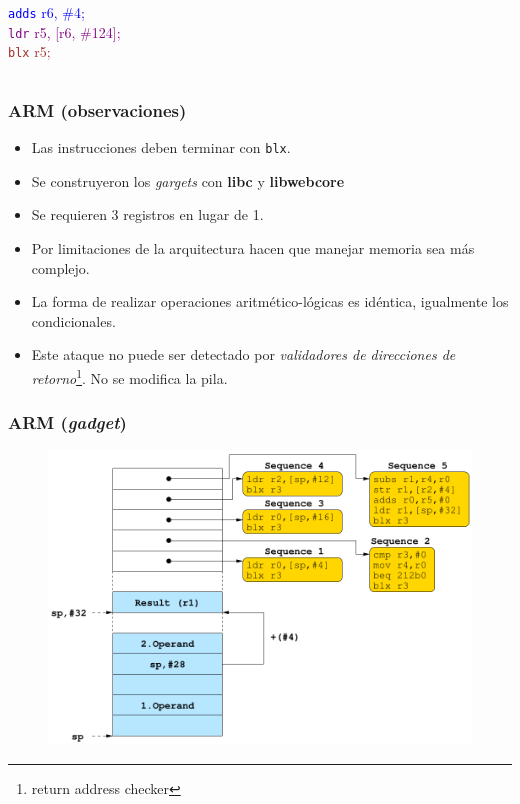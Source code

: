 \documentclass{beamer}
\begin{document}
\begin{frame}
\begin{columns}
{            \textcolor{blue}{\texttt{adds} r6, \#4;}\\
            \textcolor{purple}{\texttt{ldr} r5, [r6, \#124];}\\
            \textcolor{brown}{\texttt{blx} r5;}\\
        }
    \end{columns}
\end{frame}

\begin{frame}
    \frametitle{ARM (observaciones)}
    \begin{itemize}
        \item Las instrucciones deben terminar con \texttt{blx}.
        \item Se construyeron los \textit{gargets} con \textbf{libc} y \textbf{libwebcore}
        \item Se requieren 3 registros en lugar de 1.
        \item Por limitaciones de la arquitectura hacen que manejar memoria sea más complejo.
        \item La forma de realizar operaciones aritmético-lógicas es idéntica, igualmente los condicionales.
        \item Este ataque no puede ser detectado por \textit{validadores de direcciones de retorno}\footnote{return address checker}. No se modifica la pila.
    \end{itemize}
    
\end{frame}

\begin{frame}
    \frametitle{ARM (\textit{gadget})}
    \begin{figure}
        \centering
        \includegraphics[scale=0.3]{gadgetARM.png}
    \end{figure}
\end{frame}
\end{document}
